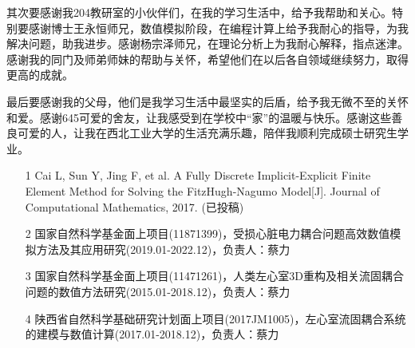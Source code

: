 \documentclass[twoside,UTF8]{nputhesis}
\begin{document}
其次要感谢我204教研室的小伙伴们，在我的学习生活中，给予我帮助和关心。特别要感谢博士王永恒师兄，数值模拟阶段，在编程计算上给予我耐心的指导，为我解决问题，助我进步。感谢杨宗泽师兄，在理论分析上为我耐心解释，指点迷津。感谢我的同门及师弟师妹的帮助与关怀，希望他们在以后各自领域继续努力，取得更高的成就。

最后要感谢我的父母，他们是我学习生活中最坚实的后盾，给予我无微不至的关怀和爱。感谢645可爱的舍友，让我感受到在学校中“家”的温暖与快乐。感谢这些善良可爱的人，让我在西北工业大学的生活充满乐趣，陪伴我顺利完成硕士研究生学业。


\Work
\begin{itemize}
\item[1] Cai L, Sun Y, Jing F, et al. A Fully Discrete Implicit-Explicit Finite Element Method for Solving the FitzHugh-Nagumo Model[J]. Journal of Computational Mathematics, 2017. (已投稿)
\item[2] 国家自然科学基金面上项目(11871399)，受损心脏电力耦合问题高效数值模拟方法及其应用研究(2019.01-2022.12)，负责人：蔡力
\item[3] 国家自然科学基金面上项目(11471261)，人类左心室3D重构及相关流固耦合问题的数值方法研究(2015.01-2018.12)，负责人：蔡力
\item[4] 陕西省自然科学基础研究计划面上项目(2017JM1005)，左心室流固耦合系统的建模与数值计算(2017.01-2018.12)，负责人：蔡力
\end{itemize}

\statement
\end{document}
